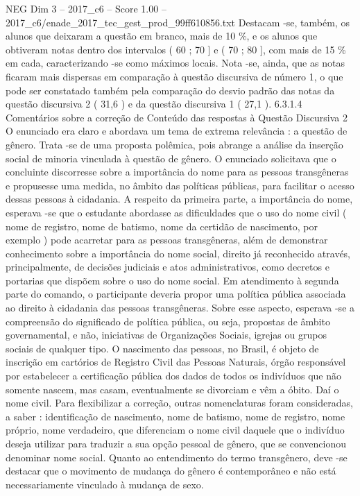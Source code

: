 \begin{textsample}{NEG Dim 3 – 2017\_c6 – Score 1.00 – 2017\_c6/enade\_2017\_tec\_gest\_prod\_99ff610856.txt}
Destacam -se, também, os alunos que deixaram a questão em branco, mais de 10 \%, e os alunos que obtiveram notas dentro dos intervalos ( 60 ; 70 ] e ( 70 ; 80 ], com mais de 15 \% em cada, caracterizando -se como máximos locais.
Nota -se, ainda, que as notas ficaram mais dispersas em comparação à questão discursiva de número 1, o que pode ser constatado também pela comparação do desvio padrão das notas da questão discursiva 2 ( 31,6 ) e da questão discursiva 1 ( 27,1 ). 6.3.1.4 Comentários sobre a correção de Conteúdo das respostas à Questão Discursiva 2 O enunciado era claro e abordava um tema de extrema relevância : a questão de gênero.
Trata -se de uma proposta polêmica, pois abrange a análise da inserção social de minoria vinculada à questão de gênero.
O enunciado solicitava que o concluinte discorresse sobre a importância do nome para as pessoas transgêneras e propusesse uma medida, no âmbito das políticas públicas, para facilitar o acesso dessas pessoas à cidadania.
A respeito da primeira parte, a importância do nome, esperava -se que o estudante abordasse as dificuldades que o uso do nome civil ( nome de registro, nome de batismo, nome da certidão de nascimento, por exemplo ) pode acarretar para as pessoas transgêneras, além de demonstrar conhecimento sobre a importância do nome social, direito já reconhecido através, principalmente, de decisões judiciais e atos administrativos, como decretos e portarias que dispõem sobre o uso do nome social.
Em atendimento à segunda parte do comando, o participante deveria propor uma política pública associada ao direito à cidadania das pessoas transgêneras.
Sobre esse aspecto, esperava -se a compreensão do significado de política pública, ou seja, propostas de âmbito governamental, e não, iniciativas de Organizações Sociais, igrejas ou grupos sociais de qualquer tipo.
O nascimento das pessoas, no Brasil, é objeto de inscrição em cartórios de Registro Civil das Pessoas Naturais, órgão responsável por estabelecer a certificação pública dos dados de todos os indivíduos que não somente nascem, mas casam, eventualmente se divorciam e vêm a óbito.
Daí o nome civil.
Para flexibilizar a correção, outras nomenclaturas foram consideradas, a saber : identificação de nascimento, nome de batismo, nome de registro, nome próprio, nome verdadeiro, que diferenciam o nome civil daquele que o indivíduo deseja utilizar para traduzir a sua opção pessoal de gênero, que se convencionou denominar nome social.
Quanto ao entendimento do termo transgênero, deve -se destacar que o movimento de mudança do gênero é contemporâneo e não está necessariamente vinculado à mudança de sexo.

\end{textsample}
